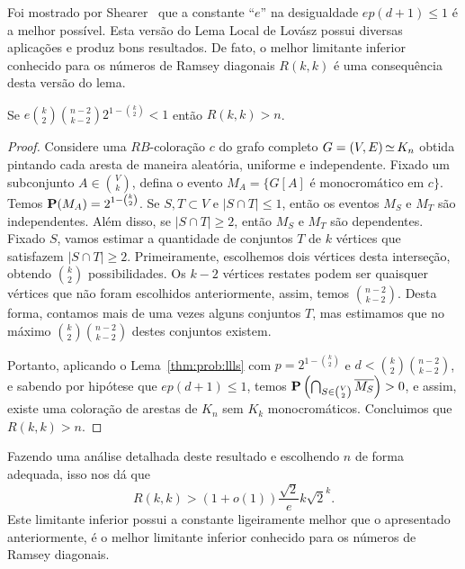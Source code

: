 Foi mostrado por Shearer~\cite{shearer1985problem} que a constante ``$e$'' na desigualdade $ep(d+1) \leq 1$ é a melhor possível. Esta versão do Lema Local de Lovász possui diversas aplicações e produz bons resultados. De fato, o melhor limitante inferior conhecido para os números de Ramsey diagonais $R(k,k)$ é uma consequência desta versão do lema.

\begin{theorem}
\label{thm:prob:ramseylll}
Se $\displaystyle e \binom{k}{2}\binom{n-2}{k-2} 2^{1 - \binom{k}{2}} < 1$ então $R(k,k) > n$.
\end{theorem}
\begin{proof}
Considere uma $RB$-coloração $c$ do grafo completo $G = (V,E) \operatorname{\simeq} K_n$ obtida pintando cada aresta de maneira aleatória, uniforme e independente. Fixado um subconjunto $A \in \binom{V}{k}$, defina o evento $M_A = \{G[A] \text{ é monocromático em } c\}$. Temos $\operatorname{\mathbf{P}}(M_A) = 2^{1- \binom{k}{2}}$. Se $S, T \subset V$ e $|S \cap T| \leq 1$, então os eventos $M_S$ e $M_T$ são independentes.
Além disso, se $|S \cap T| \geq 2$, então $M_S$ e $M_T$ são dependentes. Fixado $S$, vamos estimar a quantidade de conjuntos $T$ de $k$ vértices que satisfazem $|S \cap T| \geq 2$. Primeiramente, escolhemos dois vértices desta interseção, obtendo $\binom{k}{2}$ possibilidades. Os $k-2$ vértices restates podem ser quaisquer vértices que não foram escolhidos anteriormente, assim, temos $\binom{n-2}{k-2}$. Desta forma, contamos mais de uma vezes alguns conjuntos $T$, mas estimamos que no máximo $\binom{k}{2}\binom{n-2}{k-2}$ destes conjuntos existem.

Portanto, aplicando o Lema~\ref{thm:prob:llls} com $p = 2^{1 - \binom{k}{2}}$ e $d < \binom{k}{2}\binom{n-2}{k-2}$, e sabendo por hipótese que $ep(d+1) \leq 1$,
temos $\operatorname{\mathbf{P}} \left( \bigcap_{S \in \binom{V}{2}} \overline{M_S} \right) > 0$, e assim, existe uma coloração de arestas de $K_n$ sem $K_k$ monocromáticos. Concluimos que $R(k,k) > n$.
\end{proof}

Fazendo uma análise detalhada deste resultado e escolhendo $n$ de forma adequada, isso nos dá que
\[R(k,k) > (1+o(1))\frac{\sqrt{2}}{e}k\sqrt{2}^k.\]
Este limitante inferior possui a constante ligeiramente melhor que o apresentado anteriormente, é o melhor limitante inferior conhecido para os números de Ramsey diagonais.

